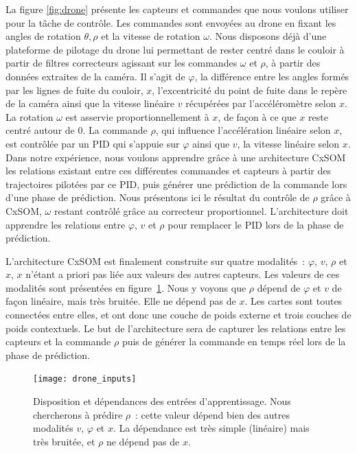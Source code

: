 \documentclass[../main]{subfiles}
\begin{document}
La figure \ref{fig:drone} présente les capteurs et commandes que nous voulons utiliser pour la tâche de contrôle.
Les commandes sont envoyées au drone en fixant les angles de rotation $\theta, \rho$ et la vitesse de rotation $\omega$.
Nous disposons déjà d'une plateforme de pilotage du drone lui permettant de rester centré dans le couloir à partir de filtres correcteurs agissant sur les commandes $\omega$ et $\rho$, à partir des données extraites de la caméra. Il s'agit de $\varphi$, la différence entre les angles formés par les lignes de fuite du couloir, $x$, l'excentricité du point de fuite dans le repère de la caméra ainsi que la vitesse linéaire $v$ récupérées par l'accéléromètre selon $x$. La rotation $\omega$ est asservie proportionnellement à $x$, de façon à ce que $x$ reste centré autour de 0.
La commande $\rho$, qui influence l'accélération linéaire selon $x$, est contrôlée par un PID qui s'appuie sur $\varphi$ ainsi que $v$, la vitesse linéaire selon $x$.
Dans notre expérience, nous voulons apprendre grâce à une architecture CxSOM les relations existant entre ces différentes commandes et capteurs à partir des trajectoires pilotées par ce PID, puis générer une prédiction de la commande lors d'une phase de prédiction.
Nous présentons ici le résultat du contrôle de $\rho$ grâce à CxSOM, $\omega$ restant contrôlé grâce au correcteur proportionnel. L'architecture doit apprendre les relations entre $\varphi$, $v$ et $\rho$ pour remplacer le PID lors de la phase de prédiction. 

L'architecture CxSOM est finalement construite sur quatre modalités~: $\varphi$, $v$, $\rho$ et $x$, $x$ n'étant a priori pas liée aux valeurs des autres capteurs. Les valeurs de ces modalités sont présentées en figure~\ref{fig:drone_inp}. Nous y voyons que $\rho$ dépend de $\varphi$ et $v$ de façon linéaire, mais très bruitée. Elle ne dépend pas de $x$.
Les cartes sont toutes connectées entre elles, et ont donc une couche de poids externe et trois couches de poids contextuels. Le but de l'architecture sera de capturer les relations entre les capteurs et la commande $\rho$ puis de générer la commande en temps réel lors de la phase de prédiction. 

\begin{figure}
	\centering\texttt{[image: drone\_inputs]}
	\caption{Disposition et dépendances des entrées d'apprentissage. Nous chercherons à prédire $\rho$~: cette valeur dépend bien des autres modalités $v$, $\varphi$ et $x$. La dépendance est très simple (linéaire) mais très bruitée, et $\rho$ ne dépend pas de $x$. \label{fig:drone_inp}}
\end{figure}
\end{document}
